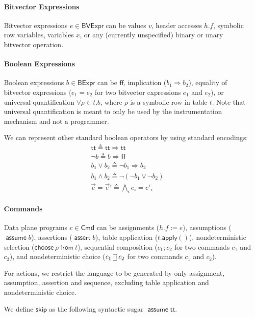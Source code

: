 \documentclass{article}
\newcommand{\TRUE}{\mathsf{tt}}
\newcommand{\FALSE}{\mathsf{ff}}
\newcommand{\BVExpr}{\mathsf{BVExpr}}
\newcommand{\BExpr}{\mathsf{BExpr}}
\newcommand{\assert}{\mathop{\mathsf{assert}}}
\newcommand{\assume}{\mathop{\mathsf{assume}}}
\newcommand{\apply}{\mathsf{apply}}
\newcommand{\choiceop}{\rotatebox[origin=c]{90}{$\sqsubset\!\!\!\sqsupset$}}
\newcommand{\choice}{\mathbin{\choiceop}}
\renewcommand{\choose}[2]{\mathsf{choose}~#1~\mathsf{from}~#2}
\newcommand{\SKIP}{\mathsf{skip}}
\begin{document}
\paragraph{Bitvector Expressions}
Bitvector expressions $e \in \BVExpr$ can be values $v$, header accesses $h.f$,
symbolic row variables, variables $x$, or any
(currently unspecified) binary or unary bitvector operation.

\paragraph{Boolean Expressions}
Boolean expressions $b \in \BExpr$ can be $\FALSE$, implication ($b_1
\Rightarrow b_2$), equality of bitvector expressions ($e_1 = e_2$ for two
bitvector expressions $e_1$ and $e_2$), or universal quantification $\forall
\rho \in t. b$, where $\rho$ is a symbolic row in table $t$. Note that universal
quantification is meant to only be used by the instrumentation mechanism and not
a programmer.

We can represent other standard boolean operators by using standard encodings:
\[\begin{array}{l}
  \TRUE \triangleq \TRUE \Rightarrow \TRUE \\
  \neg b \triangleq b \Rightarrow \FALSE \\
  b_1 \vee b_2 \triangleq \neg b_1 \Rightarrow b_2 \\
  b_1 \wedge b_2 \triangleq \neg(\neg b_1 \vee \neg b_2) \\
  \vec e = \vec e' \triangleq \bigwedge_i e_i = e'_i
\end{array}\]

\paragraph{Commands}
Data plane programs $c \in \mathsf{Cmd}$ can be assignments ($h.f := e$),
assumptions ($\assume b$), assertions ($\assert b$), table application
($t.\apply()$), nondeterministic selection ($\choose \rho t$), sequential composition ($c_1;c_2$ for two commands $c_1$ and
$c_2$), and nondeterministic choice ($c_1 \choice c_2$ for two commands $c_1$
and $c_2$).

For actions, we restrict the language to be generated by only assignment, assumption, assertion and sequence, excluding table application and nondeterministic choice.

We define $\SKIP$ as the following syntactic sugar $\assume \TRUE$.
\end{document}
